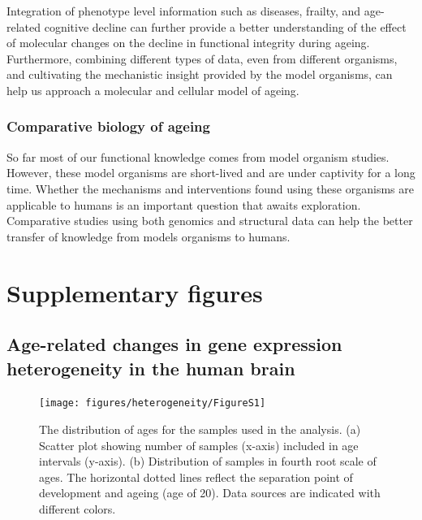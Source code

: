 \documentclass[12pt,twoside]{unicam}
\begin{document}
Integration of phenotype level information such as diseases, frailty, and age-related cognitive decline can further provide a better understanding of the effect of molecular changes on the decline in functional integrity during ageing. Furthermore, combining different types of data, even from different organisms, and cultivating the mechanistic insight provided by the model organisms, can help us approach a molecular and cellular model of ageing.

\hypertarget{comparative-biology-of-ageing}{%
\subsection{Comparative biology of ageing}\label{comparative-biology-of-ageing}}

So far most of our functional knowledge comes from model organism studies. However, these model organisms are short-lived and are under captivity for a long time. Whether the mechanisms and interventions found using these organisms are applicable to humans is an important question that awaits exploration. Comparative studies using both genomics and structural data can help the better transfer of knowledge from models organisms to humans.

\appendix

\hypertarget{supplementary-figures}{%
\chapter{Supplementary figures}\label{supplementary-figures}}

\hypertarget{age-related-changes-in-gene-expression-heterogeneity-in-the-human-brain}{%
\section{Age-related changes in gene expression heterogeneity in the human brain}\label{age-related-changes-in-gene-expression-heterogeneity-in-the-human-brain}}

\begin{figure}

{\centering \texttt{[image: figures/heterogeneity/FigureS1]} 

}

\caption[Age distribution of individual datasets,]{The distribution of ages for the samples used in the analysis. (a) Scatter plot showing number of samples (x-axis) included in age intervals (y-axis). (b) Distribution of samples in fourth root scale of ages. The horizontal dotted lines reflect the separation point of development and ageing (age of 20). Data sources are indicated with different colors.}\label{fig:hetFigS1}
\end{figure}
\end{document}
